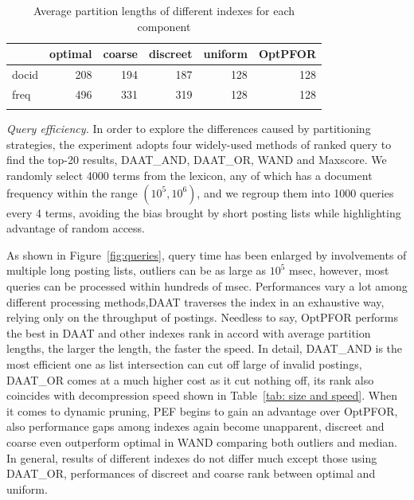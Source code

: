 \documentclass[runningheads,a4paper]{llncs}
\begin{document}
\begin{table}
	\centering
	\caption{Average partition lengths of different indexes for each component}
	\renewcommand{\arraystretch}{1.0}
	\begin{tabular}{@{}l*{5}{r}} \toprule
		& \multicolumn{1}{c}{optimal} & \multicolumn{1}{c}{coarse} & \multicolumn{1}{c}{discreet} & \multicolumn{1}{c}{uniform}& \multicolumn{1}{c}{OptPFOR} \\ \midrule
		docid & 208 & 194 & 187 & 128 & 128 \\
		freq  & 496 & 331 & 319 & 128 & 128 \\
		\bottomrule
		\label{tab: chunk size}
	\end{tabular}
\end{table}

\textit{Query efficiency.}
In order to explore the differences caused by partitioning strategies, the experiment adopts four widely-used methods of ranked query to find the top-20 results, DAAT\_AND, DAAT\_OR, WAND and Maxscore. We randomly select 4000 terms from the lexicon, any of which has a document frequency within the range $(10^{5},10^{6})$, and we regroup them into 1000 queries every 4 terms, avoiding the bias brought by short posting lists while highlighting advantage of random access.

As shown in Figure~\ref{fig:queries}, query time has been enlarged by involvements of multiple long posting lists, outliers can be as large as $10^{5}$ msec, however, most queries can be processed within hundreds of msec. Performances vary a lot among different processing methods,DAAT traverses the index in an exhaustive way, relying only on the throughput of postings. Needless to say, OptPFOR performs the best in DAAT and other indexes rank in accord with average partition lengths, the larger the length, the faster the speed. In detail, DAAT\_AND is the most efficient one as list intersection can cut off large of invalid postings, DAAT\_OR comes at a much higher cost as it cut nothing off, its rank also coincides with decompression speed shown in Table~\ref{tab: size and speed}. When it comes to dynamic pruning, PEF begins to gain an advantage over OptPFOR, also performance gaps among indexes again become unapparent, discreet and coarse even outperform optimal in WAND comparing both outliers and median. In general, results of different indexes do not differ much except those using DAAT\_OR, performances of discreet and coarse rank between optimal and uniform.
\end{document}
